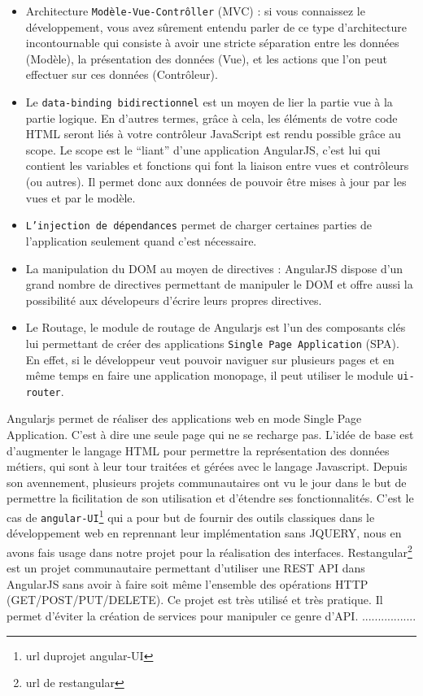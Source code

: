 \documentclass[a4paper,11pt]{report}
\begin{document}
\begin{itemize}
 \item Architecture {\tt Modèle-Vue-Contrôller} (MVC) :
  si vous connaissez le développement, vous avez sûrement entendu parler
  de ce type d'architecture incontournable qui consiste à avoir une stricte
  séparation entre les données (Modèle), la présentation des données (Vue),
  et les actions que l'on peut effectuer sur ces données (Contrôleur).
  \item Le {\tt data-binding bidirectionnel} est un moyen de lier la partie vue
  à la partie logique. En d'autres termes, grâce à cela, les éléments de 
  votre code HTML seront liés à votre contrôleur JavaScript est rendu 
  possible grâce au scope.  Le scope est le “liant” d’une application AngularJS,
  c’est lui qui contient les variables et fonctions qui font la liaison entre vues 
  et contrôleurs (ou autres). Il permet donc aux données de pouvoir être mises à 
  jour par les vues et par le modèle.
  \item {\tt L’injection de dépendances} permet de charger certaines parties de 
  l’application seulement quand c’est nécessaire.
  \item La manipulation du DOM au moyen de directives : AngularJS dispose d'un grand
  nombre de directives permettant de manipuler le DOM et offre aussi la possibilité 
  aux dévelopeurs d'écrire leurs propres directives.
  \item Le Routage, le module de routage de Angularjs est l'un des composants clés 
  lui permettant de créer des applications {\tt Single Page Application} (SPA). En effet,
  si le développeur veut pouvoir naviguer sur plusieurs pages et en même temps en faire une
  application monopage, il peut utiliser le module {\tt ui-router}.
  \end{itemize}
  
  Angularjs permet de réaliser des applications web en mode Single Page 
  Application. 
  C'est à dire une seule page qui ne se recharge pas. L'idée de base est 
  d'augmenter le langage HTML pour permettre la représentation des données
  métiers, qui sont à leur tour traitées et gérées avec le langage Javascript. 
  Depuis son avennement, plusieurs projets communautaires ont vu le jour dans 
  le but de permettre la ficilitation de son utilisation et d'étendre ses 
  fonctionnalités. C'est le cas de {\tt angular-UI}\footnote{url duprojet angular-UI}
  qui a pour but de fournir des outils classiques  dans le développement web en
  reprennant leur implémentation sans JQUERY, nous en avons fais usage dans notre 
  projet pour la réalisation des  interfaces. Restangular\footnote{url de restangular} 
  est un projet communautaire permettant d'utiliser une REST API dans AngularJS 
  sans avoir à faire soit même l'ensemble des opérations HTTP (GET/POST/PUT/DELETE).
  Ce projet est très utilisé et très pratique. Il permet d'éviter la création
  de services pour manipuler ce genre d'API. .................
  
\end{document}
